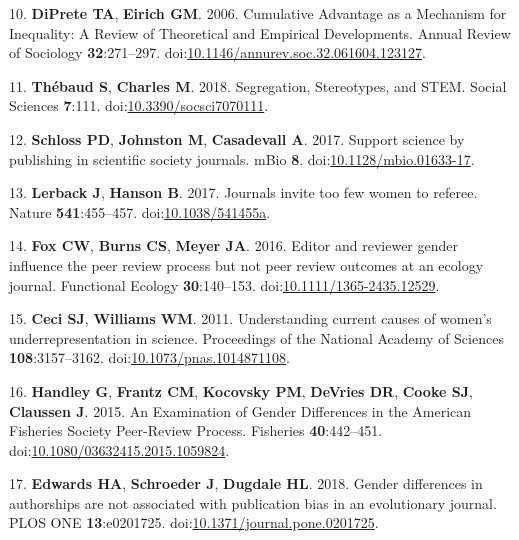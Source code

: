 \documentclass[11pt,]{article}
\begin{document}
\hypertarget{ref-diprete_cumulative_2006}{}
10. \textbf{DiPrete TA}, \textbf{Eirich GM}. 2006. Cumulative Advantage
as a Mechanism for Inequality: A Review of Theoretical and Empirical
Developments. Annual Review of Sociology \textbf{32}:271--297.
doi:\href{https://doi.org/10.1146/annurev.soc.32.061604.123127}{10.1146/annurev.soc.32.061604.123127}.

\hypertarget{ref-thebaud_segregation_2018}{}
11. \textbf{Thébaud S}, \textbf{Charles M}. 2018. Segregation,
Stereotypes, and STEM. Social Sciences \textbf{7}:111.
doi:\href{https://doi.org/10.3390/socsci7070111}{10.3390/socsci7070111}.

\hypertarget{ref-Schloss2017}{}
12. \textbf{Schloss PD}, \textbf{Johnston M}, \textbf{Casadevall A}.
2017. Support science by publishing in scientific society journals. mBio
\textbf{8}.
doi:\href{https://doi.org/10.1128/mbio.01633-17}{10.1128/mbio.01633-17}.

\hypertarget{ref-lerback_journals_2017}{}
13. \textbf{Lerback J}, \textbf{Hanson B}. 2017. Journals invite too few
women to referee. Nature \textbf{541}:455--457.
doi:\href{https://doi.org/10.1038/541455a}{10.1038/541455a}.

\hypertarget{ref-fox_editor_2016}{}
14. \textbf{Fox CW}, \textbf{Burns CS}, \textbf{Meyer JA}. 2016. Editor
and reviewer gender influence the peer review process but not peer
review outcomes at an ecology journal. Functional Ecology
\textbf{30}:140--153.
doi:\href{https://doi.org/10.1111/1365-2435.12529}{10.1111/1365-2435.12529}.

\hypertarget{ref-ceci_understanding_2011}{}
15. \textbf{Ceci SJ}, \textbf{Williams WM}. 2011. Understanding current
causes of women's underrepresentation in science. Proceedings of the
National Academy of Sciences \textbf{108}:3157--3162.
doi:\href{https://doi.org/10.1073/pnas.1014871108}{10.1073/pnas.1014871108}.

\hypertarget{ref-handley_examination_2015}{}
16. \textbf{Handley G}, \textbf{Frantz CM}, \textbf{Kocovsky PM},
\textbf{DeVries DR}, \textbf{Cooke SJ}, \textbf{Claussen J}. 2015. An
Examination of Gender Differences in the American Fisheries Society
Peer-Review Process. Fisheries \textbf{40}:442--451.
doi:\href{https://doi.org/10.1080/03632415.2015.1059824}{10.1080/03632415.2015.1059824}.

\hypertarget{ref-edwards_gender_2018}{}
17. \textbf{Edwards HA}, \textbf{Schroeder J}, \textbf{Dugdale HL}.
2018. Gender differences in authorships are not associated with
publication bias in an evolutionary journal. PLOS ONE
\textbf{13}:e0201725.
doi:\href{https://doi.org/10.1371/journal.pone.0201725}{10.1371/journal.pone.0201725}.
\end{document}
